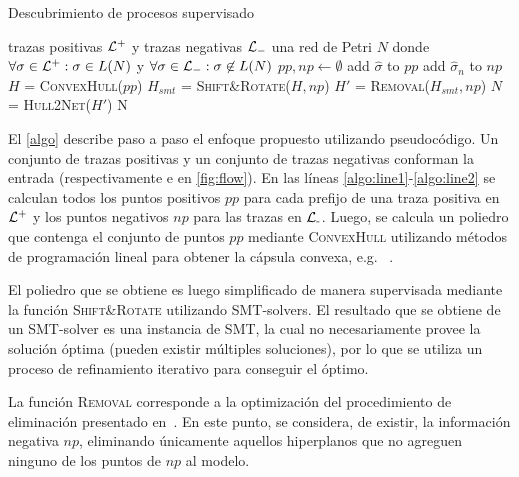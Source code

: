 \begin{algorithm}[H]
\caption{Descubrimiento de procesos supervisado}
  \begin{algorithmic}[1]
      \Require trazas positivas ${\mathcal L}^+$ y trazas negativas ${\mathcal L}_-$
      \Ensure una red de Petri $N$ donde $\forall \sigma \in {\mathcal L}^+: \sigma \in L(N)$ y $\forall \sigma \in {\mathcal L}_-: \sigma \not \in L(N)$
      \vspace{1pt}
      \State $pp, np \leftarrow \emptyset$ \label{algo:line1}
          \State add $\widehat\sigma$ to $pp$
       \EndFor
     \EndFor
        \State add $\widehat\sigma_n$ to $np$
      \EndFor \label{algo:line2}
      \State $H$ = \textsc{ConvexHull}($pp$) \label{algo:lineqhull}
      \State $H_{smt}$ = \textsc{Shift\&Rotate}($H, np$)
      \State $H'$ = \textsc{Removal}($H_{smt}, np$)
      \State $N$ = \textsc{Hull2Net}($H'$)
      \State \Return N
      \EndProcedure
  \end{algorithmic}
  \label{algo}
\end{algorithm}

El \autoref{algo} describe paso a paso el enfoque propuesto utilizando pseudocódigo. Un conjunto de trazas 
positivas y un conjunto de trazas negativas conforman la entrada 
(respectivamente  e  en \autoref{fig:flow}). 
En las líneas \ref{algo:line1}-\ref{algo:line2} se calculan todos los puntos positivos $pp$ para
cada prefijo de una traza positiva en ${\mathcal L}\textsuperscript{+}$ y los puntos negativos $np$ para las trazas en ${\mathcal L}\textsubscript{-}$\footnotemark[1].
Luego, se calcula un poliedro que contenga el conjunto de puntos $pp$ mediante \textsc{ConvexHull} utilizando 
métodos de programación lineal para obtener la cápsula convexa, e.g. \qhulltool~\cite{Barber96}.

El poliedro que se obtiene es luego simplificado de manera supervisada mediante la función 
\textsc{Shift\&Rotate} utilizando SMT-solvers. El resultado que se obtiene de un SMT-solver es 
una instancia de SMT, la cual no necesariamente provee la solución óptima (pueden existir múltiples soluciones), 
por lo que se utiliza un proceso de refinamiento iterativo para conseguir el óptimo.

La función \textsc{Removal} corresponde a la optimización del procedimiento de eliminación presentado en~\cite{LeonCB15}.
En este punto, se considera, de existir, la información negativa $np$, eliminando únicamente aquellos hiperplanos
que no agreguen ninguno de los puntos de $np$ al modelo.


